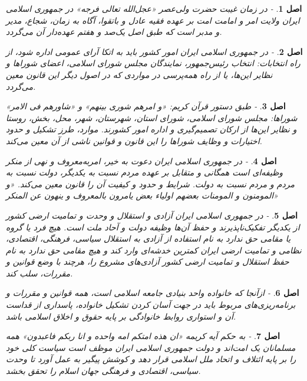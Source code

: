 \documentclass[12pt]{article}
\newtheorem{asl}{اصل}
\begin{document}
\begin{asl}- 
در زمان غیبت حضرت ولی‌عصر «عجل‌الله تعالی فرجه‌» در جمهوری اسلامی ایران ولایت امر و امامت امت بر عهده فقیه عادل و باتقوا، آگاه به زمان‌، شجاع‌، مدیر و مدبر است که طبق اصل ‌یک‌صد و هفتم عهده‌دار آن می‌گردد.
\end{asl}

\begin{asl}- 
در جمهوری اسلامی ایران امور کشور باید به اتکا آرای عمومی اداره شود، از راه انتخابات‌: انتخاب رئیس‌جمهور، نمایندگان مجلس شورای اسلامی‌، اعضای شوراها و نظایر این‌ها، یا از راه همه‌پرسی در مواردی که در اصول دیگر این قانون معین ‌می‌گردد.
\end{asl}

\begin{asl}- 
طبق دستور قرآن کریم‌: «و امرهم شوری بینهم» و «شاورهم فی الامر» شوراها: مجلس شورای اسلامی‌، شورای استان‌، شهرستان‌، شهر، محل‌، بخش‌، روستا و نظایر این‌ها از ارکان تصمیم‌گیری و اداره امور کشورند.
موارد، طرز تشکیل و حدود اختیارات و وظایف شوراها را این ‌قانون و قوانین ناشی از آن معین می‌کند.
\end{asl}

\begin{asl}- 
در جمهوری اسلامی ایران دعوت به خیر، امربه‌معروف و نهی از منکر وظیفه‌ای است همگانی و متقابل بر عهده مردم نسبت به یکدیگر، دولت نسبت به مردم و مردم نسبت به دولت‌. شرایط و حدود و کیفیت آن را قانون معین می‌کند. «و المومنون و المومنات بعضهم اولیاء بعض یامرون بالمعروف و ینهون عن المنکر»
\end{asl}

\begin{asl}- 
در جمهوری اسلامی ایران آزادی و استقلال و وحدت و تمامیت ارضی کشور از یکدیگر تفکیک‌ناپذیرند و حفظ آن‌ها وظیفه دولت و آحاد ملت است‌. هیچ فرد یا گروه یا مقامی حق ندارد به نام استفاده از آزادی به استقلال سیاسی‌، فرهنگی‌، اقتصادی‌، نظامی و تمامیت ارضی ایران کمترین خدشه‌ای وارد کند و هیچ مقامی حق ندارد به نام حفظ استقلال و تمامیت ارضی کشور آزادی‌های مشروع را، هرچند با وضع قوانین و مقررات‌، سلب کند.
\end{asl}

\begin{asl}- 
ازآنجا که خانواده واحد بنیادی جامعه اسلامی است‌، همه قوانین و مقررات و برنامه‌ریزی‌های مربوط باید در جهت آسان کردن‌ تشکیل خانواده‌، پاسداری از قداست آن و استواری روابط خانوادگی ‌بر پایه حقوق و اخلاق اسلامی باشد.
\end{asl}

\begin{asl}- 
به حکم آیه کریمه «ان هذه امتکم امه واحده و انا ربکم فاعبدون» همه مسلمانان یک امت‌اند و دولت جمهوری اسلامی ایران موظف است سیاست کلی خود را بر پایه ائتلاف و اتحاد ملل اسلامی قرار دهد و کوشش پیگیر به عمل آورد تا وحدت سیاسی‌، اقتصادی و فرهنگی جهان اسلام را تحقق بخشد.
\end{asl}
\end{document}
